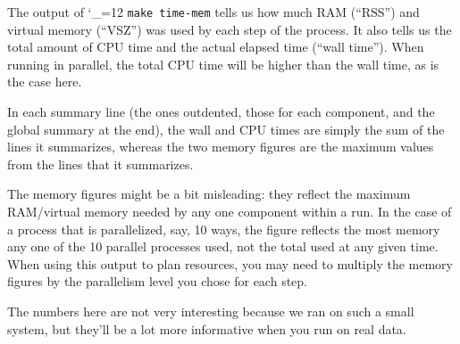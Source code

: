 \documentclass[11pt,letterpaper]{article}
\def\code{\begingroup\catcode`\_=12 \codex}
\newcommand{\codex}[1]{\texttt{#1}\endgroup}
\begin{document}
The output of \code{make time-mem} tells us how much RAM (``RSS'') and
virtual memory (``VSZ'') was used by each step of the process. It also tells us
the total amount of CPU time and the actual elapsed time (``wall time'').  When
running in parallel, the total CPU time will be higher than the wall time, as is
the case here.

In each summary line (the ones outdented, those for each component, and the
global summary at the end), the wall and CPU times are simply the sum of the
lines it summarizes, whereas the two memory figures are the maximum values from
the lines that it summarizes.

The memory figures might be a bit misleading: they reflect the maximum
RAM/virtual memory needed by any one component within a run.  In the case of a
process that is parallelized, say, 10 ways, the figure reflects the most memory
any one of the 10 parallel processes used, not the total used at any given
time.  When using this output to plan resources, you may need to multiply the
memory figures by the parallelism level you chose for each step.

The numbers here are not very interesting because we ran on such a small
system, but they'll be a lot more informative when you run on real data.
\end{document}
